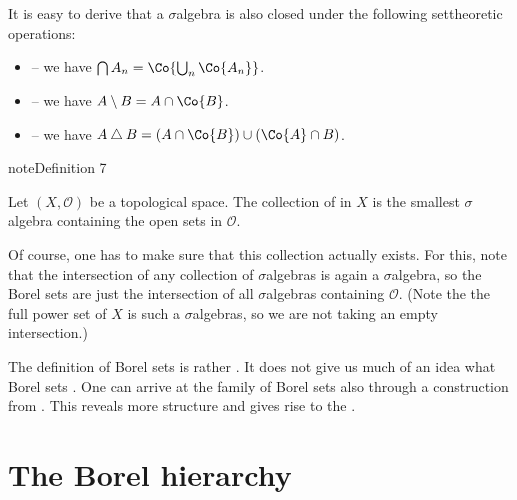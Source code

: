 \documentclass[letterpaper,10pt,english]{jupyterBook}
\begin{document}
\sphinxAtStartPar
It is easy to derive that a \(\sigma\)\sphinxhyphen{}algebra is also closed under the following set\sphinxhyphen{}theoretic operations:
\begin{itemize}
\item {} 
\sphinxAtStartPar
{} – we have \(\bigcap A_n = \Co{\bigcup_n \Co{A_n}}\).

\item {} 
\sphinxAtStartPar
{} – we have \(A \setminus B = A \cap \Co{B}\).

\item {} 
\sphinxAtStartPar
{} – we have \(A \bigtriangleup B = (A \cap \Co{B}) \cup (\Co{A} \cap B)\).

\end{itemize}
\label{Borel:definition-1}
\begin{sphinxadmonition}{note}{Definition 7}



\sphinxAtStartPar
Let \((X,\mathcal{O})\) be a topological space. The collection of  in \(X\) is the smallest \(\sigma\)\sphinxhyphen{}algebra containing the open sets in \(\mathcal{O}\).
\end{sphinxadmonition}

\sphinxAtStartPar
Of course, one has to make sure that this collection actually exists. For this, note that the intersection of any collection of \(\sigma\)\sphinxhyphen{}algebras is again a \(\sigma\)\sphinxhyphen{}algebra, so the Borel sets are just the intersection of all \(\sigma\)\sphinxhyphen{}algebras containing \(\mathcal{O}\). (Note the the full power set of \(X\) is such a \(\sigma\)\sphinxhyphen{}algebras, so we are not taking an empty intersection.)

\sphinxAtStartPar
The definition of Borel sets is rather . It does not give us much of an idea what Borel sets . One can arrive at the family of Borel sets also through a construction from . This reveals more structure and gives rise to the .


\section{The Borel hierarchy}
\label{\detokenize{Borel:the-borel-hierarchy}}
\end{document}
